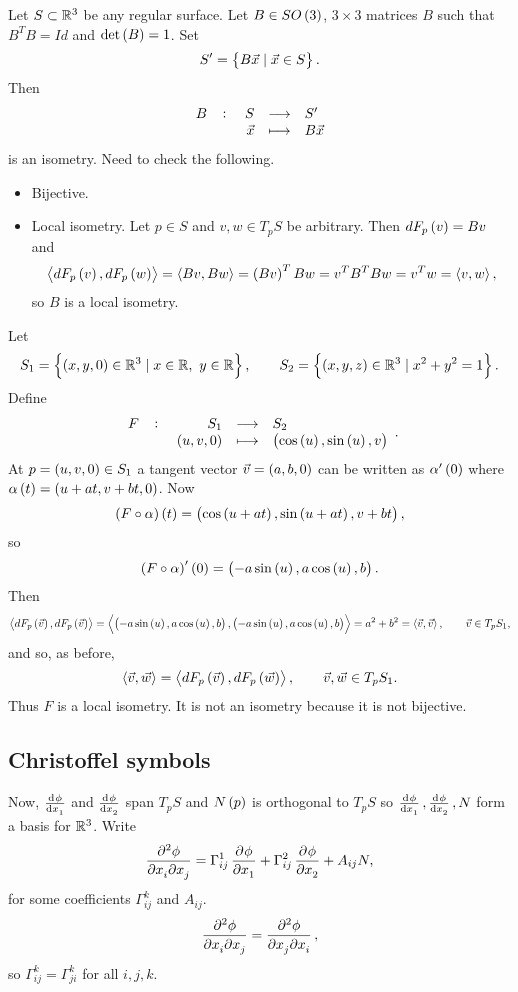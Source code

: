 \begin{example*}
Let $ S \subset \mathbb{R}^3 $ be any regular surface. Let $ B \in SO\br{3} $, $ 3 \times 3 $ matrices $ B $ such that $ B^TB = Id $ and $ \det\br{B} = 1 $. Set
$$ S' = \cbr{B\vec{x} \mid \vec{x} \in S}. $$
Then
$$ \function[B]{S}{S'}{\vec{x}}{B\vec{x}} $$
is an isometry. Need to check the following.
\begin{itemize}
\item Bijective.
\item Local isometry. Let $ p \in S $ and $ v, w \in T_pS $ be arbitrary. Then $ dF_p\br{v} = Bv $ and
$$ \abr{dF_p\br{v}, dF_p\br{w}} = \abr{Bv, Bw} = \br{Bv}^TBw = v^TB^TBw = v^Tw = \abr{v, w}, $$
so $ B $ is a local isometry.
\end{itemize}
\end{example*}

\begin{example*}
Let
$$ S_1 = \cbr{\br{x, y, 0} \in \R^3 \mid x \in \R, \ y \in \R}, \qquad S_2 = \cbr{\br{x, y, z} \in \R^3 \mid x^2 + y^2 = 1}. $$
Define
$$ \function[F]{S_1}{S_2}{\br{u, v, 0}}{\br{\cos\br{u}, \sin\br{u}, v}}. $$
At $ p = \br{u, v, 0} \in S_1 $ a tangent vector $ \vec{v} = \br{a, b, 0} $ can be written as $ \alpha'\br{0} $ where $ \alpha\br{t} = \br{u + at, v + bt, 0} $. Now
$$ \br{F \circ \alpha}\br{t} = \br{\cos\br{u + at}, \sin\br{u + at}, v + bt}, $$
so
$$ \br{F \circ \alpha}'\br{0} = \br{-a\sin\br{u}, a\cos\br{u}, b}. $$
Then
$$ \abr{dF_p\br{\vec{v}}, dF_p\br{\vec{v}}} = \abr{\br{-a\sin\br{u}, a\cos\br{u}, b}, \br{-a\sin\br{u}, a\cos\br{u}, b}} = a^2 + b^2 = \abr{\vec{v}, \vec{v}}, \qquad \vec{v} \in T_pS_1, $$
and so, as before,
$$ \abr{\vec{v}, \vec{w}} = \abr{dF_p\br{\vec{v}}, dF_p\br{\vec{w}}}, \qquad \vec{v}, \vec{w} \in T_pS_1. $$
Thus $ F $ is a local isometry. It is not an isometry because it is not bijective.
\end{example*}

\pagebreak

\subsection{Christoffel symbols}


Now, $ \tod{\phi}{x_1} $ and $ \tod{\phi}{x_2} $ span $ T_pS $ and $ N\br{p} $ is orthogonal to $ T_pS $ so $ \tod{\phi}{x_1}, \tod{\phi}{x_2}, N $ form a basis for $ \mathbb{R}^3 $. Write
\begin{equation}
\label{eq:2}
\dmd{\phi}{2}{x_i}{}{x_j}{} = \Gamma_{ij}^1\dpd{\phi}{x_1} + \Gamma_{ij}^2\dpd{\phi}{x_2} + A_{ij}N,
\end{equation}
for some coefficients $ \Gamma_{ij}^k $ and $ A_{ij} $.
$$ \dmd{\phi}{2}{x_i}{}{x_j}{} = \dmd{\phi}{2}{x_j}{}{x_i}{}, $$
so $ \Gamma_{ij}^k = \Gamma_{ji}^k $ for all $ i, j, k $.

